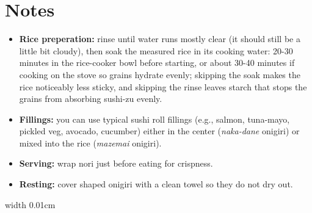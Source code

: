 \documentclass[landscape, a4paper]{article}
\newcommand\alert[1]{\textcolor{PrimaryColor}{\textbf{#1}}}
\begin{document}
\begin{minipage}[t]{0.31\textwidth}
	\vspace{0.4cm}
	\section*{Notes}

	\begin{itemize}
		\item \alert{Rice preperation:} rinse until water runs mostly clear (it should still be a little bit cloudy), then soak the measured rice in its cooking water: 20-30 minutes in the rice-cooker bowl before starting, or about 30-40 minutes if cooking on the stove so grains hydrate evenly; skipping the soak makes the rice noticeably less sticky, and skipping the rinse leaves starch that stops the grains from absorbing sushi-zu evenly.
		\item \alert{Fillings:} you can use typical sushi roll fillings (e.g., salmon, tuna-mayo, pickled veg, avocado, cucumber) either in the center (\textit{naka-dane} onigiri) or mixed into the rice (\textit{mazemai} onigiri).
		\item \alert{Serving:} wrap nori just before eating for crispness.
		\item \alert{Resting:} cover shaped onigiri with a clean towel so they do not dry out.
	\end{itemize}
\end{minipage}%
\hfill\color{DividerColor}%
\vrule width 0.01cm
\hfill\color{SoyBrown}%
\end{document}
